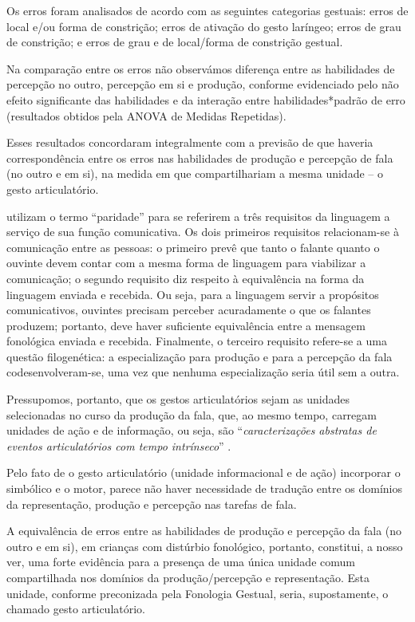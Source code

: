 \documentclass[output=paper,colorlinks,citecolor=brown,booklanguage=portuguese]{langscibook}
\begin{document}
Os erros foram analisados de acordo com as seguintes categorias gestuais: erros de local e/ou forma de constrição; erros de ativação do gesto laríngeo; erros de grau de constrição; e erros de grau e de local/forma de constrição gestual.

Na comparação entre os erros não observámos diferença entre as habilidades de percepção no outro, percepção em si e produção, conforme evidenciado pelo não efeito significante das habilidades e da interação entre habilidades*padrão de erro (resultados obtidos pela ANOVA de Medidas Repetidas).

Esses resultados concordaram integralmente com a previsão de que haveria correspondência entre os erros nas habilidades de produção e percepção de fala (no outro e em si), na medida em que compartilhariam a mesma unidade – o gesto articulatório.

\citet{Liberman2000} utilizam o termo “paridade” para se referirem a três requisitos da linguagem a serviço de sua função comunicativa. Os dois primeiros requisitos relacionam-se à comunicação entre as pessoas: o primeiro prevê que tanto o falante quanto o ouvinte devem contar com a mesma forma de linguagem para viabilizar a comunicação; o segundo requisito diz respeito à equivalência na forma da linguagem enviada e recebida. Ou seja, para a linguagem servir a propósitos comunicativos, ouvintes precisam perceber acuradamente o que os falantes produzem; portanto, deve haver suficiente equivalência entre a mensagem fonológica enviada e recebida. Finalmente, o terceiro requisito refere-se a uma questão filogenética: a especialização para produção e para a percepção da fala codesenvolveram-se, uma vez que nenhuma especialização seria útil sem a outra.

Pressupomos, portanto, que os gestos articulatórios sejam as unidades selecionadas no curso da produção da fala, que, ao mesmo tempo, carregam unidades de ação e de informação, ou seja, são “\emph{caracterizações abstratas de eventos articulatórios com tempo intrínseco}” \citep[155-156]{Browman1992}.

Pelo fato de o gesto articulatório (unidade informacional e de ação) incorporar o simbólico e o motor, parece não haver necessidade de tradução entre os domínios da representação, produção e percepção nas tarefas de fala.

A equivalência de erros entre as habilidades de produção e percepção da fala (no outro e em si), em crianças com distúrbio fonológico, portanto, constitui, a nosso ver, uma forte evidência para a presença de uma única unidade comum compartilhada nos domínios da produção/percepção e representação. Esta unidade, conforme preconizada pela Fonologia Gestual, seria, supostamente, o chamado gesto articulatório.
\end{document}
